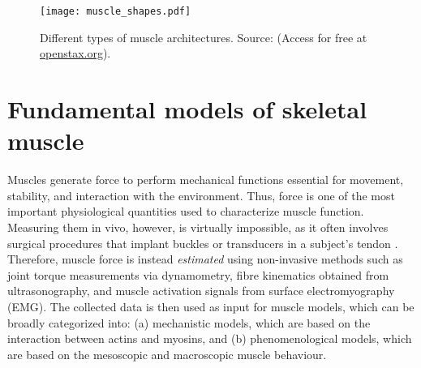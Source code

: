 \documentclass{sfuthesis}
\numberwithin{equation}{section}
\numberwithin{figure}{chapter}
\numberwithin{table}{chapter}
\theoremstyle{definition}
\begin{document}
\begin{figure}
    \centering
    \texttt{[image: muscle\_shapes.pdf]}
    \caption{Different types of muscle architectures. Source: \cite{AnatomyPhysiologyBook2022} (Access for free at \url{openstax.org}).\label{fig:muscle_architectures}}
\end{figure}

\section{Fundamental models of skeletal muscle}


Muscles generate force to perform mechanical functions essential for movement, stability, and interaction with the environment. Thus, force is one of the most important physiological quantities used to characterize muscle function. Measuring them in vivo, however, is virtually impossible, as it often involves surgical procedures that implant buckles or transducers in a subject's tendon \cite{Biewener1998KangarooRats,Komi1990}. Therefore, muscle force is instead \textit{estimated} using non-invasive methods such as joint torque measurements via dynamometry, fibre kinematics obtained from ultrasonography, and muscle activation signals from surface electromyography (EMG). The collected data is then used as input for muscle models, which can be broadly categorized into: (a) mechanistic models, which are based on the interaction between actins and myosins, and (b) phenomenological models, which are based on the mesoscopic and macroscopic muscle behaviour.
\end{document}
